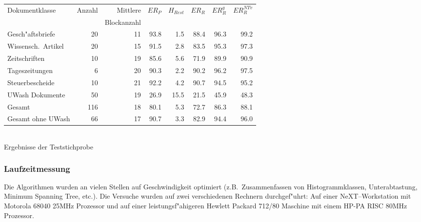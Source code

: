 \begin{center}\small
\begin{tabular}{|l|r|r|r|r|r|r|r|}
\hline
Dokumentklasse   &   Anzahl & Mittlere& $ER_{P}$& $H_{Rest}$ & $ER_{R}$ & $ER_{R}^{g}$ & $ER_{R}^{NTv}$\\
                 &          &Blockanzahl& &  & & & \\
\hline
Gesch"aftsbriefe           & 20 & 11 & 93.8 & 1.5 & 88.4 & 96.3 & 99.2\\
Wissensch.\ Artikel       & 20 & 15 & 91.5 & 2.8 & 83.5 & 95.3 & 97.3\\
Zeitschriften             & 10 & 19 & 85.6 & 5.6 & 71.9 & 89.9 & 90.9\\
Tageszeitungen            &  6 & 20 & 90.3 & 2.2 & 90.2 & 96.2 & 97.5\\
Steuerbescheide           & 10 & 21 & 92.2 & 4.2 & 90.7 & 94.5 & 95.2\\
UWash Dokumente           & 50 & 19 & 26.9 & 15.5& 21.5 & 45.9 & 48.3\\
\hline
Gesamt                    &116 & 18 & 80.1& 5.3& 72.7 & 86.3 & 88.1\\
\hline
Gesamt ohne UWash         & 66 & 17 & 90.7& 3.3& 82.9 & 94.4 & 96.0\\
\hline
\end{tabular}\\[3mm]
Ergebnisse der Teststichprobe
\end{center}

\subsubsection{Laufzeitmessung} \label{Speed}
Die Algorithmen wurden an vielen Stellen auf Geschwindigkeit optimiert (z.B.\ Zusammenfassen
von Histogrammklassen, Unterabtastung, Minimum Spanning Tree, etc.). Die Versuche wurden auf zwei
verschiedenen Rechnern durchgef"uhrt: Auf einer  NeXT--Workstation mit Motorola 68040 25MHz
Prozessor und auf einer leistungsf"ahigeren Hewlett Packard 712/80 Maschine mit einem 
HP-PA RISC 80MHz Prozessor.

